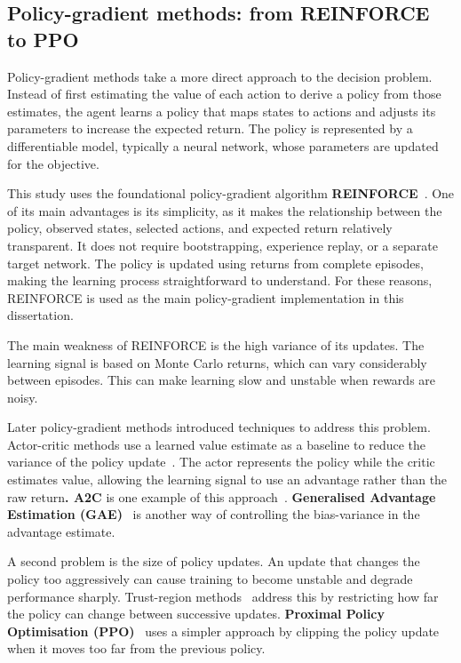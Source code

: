 \subsection{Policy-gradient methods: from REINFORCE to PPO}
Policy-gradient methods take a more direct approach to the decision
problem. Instead of first estimating the value of each action to derive
a policy from those estimates, the agent learns a policy that maps
states to actions and adjusts its parameters to increase the expected
return. The policy is represented by a differentiable model, typically a
neural network, whose parameters are updated for the objective.

This study uses the foundational policy-gradient algorithm
\textbf{REINFORCE}~\cite{williams1992}. One of its main advantages is its
simplicity, as it makes the relationship between the policy, observed
states, selected actions, and expected return relatively transparent. It
does not require bootstrapping, experience replay, or a separate target
network. The policy is updated using returns from complete episodes,
making the learning process straightforward to understand. For these
reasons, REINFORCE is used as the main policy-gradient implementation in
this dissertation.

The main weakness of REINFORCE is the high variance of its updates. The
learning signal is based on Monte Carlo returns, which can vary
considerably between episodes. This can make learning slow and unstable
when rewards are noisy.

Later policy-gradient methods introduced techniques to address this
problem. Actor-critic methods use a learned value estimate as a baseline
to reduce the variance of the policy update~\cite{konda2000}. The actor
represents the policy while the critic estimates value, allowing the
learning signal to use an advantage rather than the raw return\textbf{.
A2C} is one example of this approach~\cite{mnih2016}. \textbf{Generalised
Advantage Estimation (GAE)}~\cite{schulman2016gae} is another way of controlling the
bias-variance in the advantage estimate.

A second problem is the size of policy updates. An update that changes
the policy too aggressively can cause training to become unstable and
degrade performance sharply. Trust-region methods~\cite{schulman2015trpo} address this
by restricting how far the policy can change between successive updates.
\textbf{Proximal Policy Optimisation (PPO)}~\cite{schulman2017ppo} uses a simpler
approach by clipping the policy update when it moves too far from the
previous policy.

